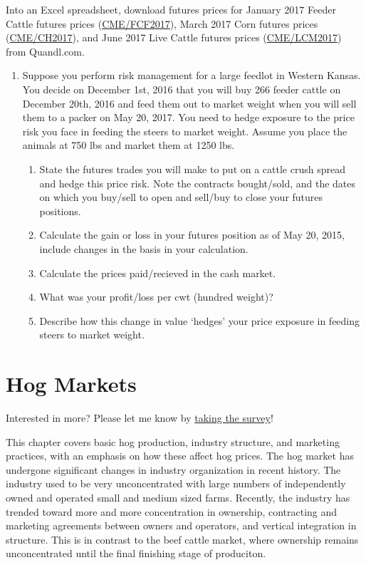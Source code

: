 \documentclass[
  letterpaper,
  DIV=11,
  numbers=noendperiod]{scrreprt}
\providecommand{\tightlist}{%
  \setlength{\itemsep}{0pt}\setlength{\parskip}{0pt}}\usepackage{longtable,booktabs,array}
\begin{document}
Into an Excel spreadsheet, download futures prices for January 2017
Feeder Cattle futures prices
(\href{https://www.quandl.com/data/CME/FCF2017}{CME/FCF2017}), March
2017 Corn futures prices
(\href{https://www.quandl.com/data/CME/CH2017}{CME/CH2017}), and June
2017 Live Cattle futures prices
(\href{https://www.quandl.com/data/CME/LCM2017}{CME/LCM2017}) from
Quandl.com.

\begin{enumerate}
\def\labelenumi{\arabic{enumi}.}
\item
  Suppose you perform risk management for a large feedlot in Western
  Kansas. You decide on December 1st, 2016 that you will buy 266 feeder
  cattle on December 20th, 2016 and feed them out to market weight when
  you will sell them to a packer on May 20, 2017. You need to hedge
  exposure to the price risk you face in feeding the steers to market
  weight. Assume you place the animals at 750 lbs and market them at
  1250 lbs.

  \begin{enumerate}
  \def\labelenumii{\alph{enumii}.}
  \tightlist
  \item
    State the futures trades you will make to put on a cattle crush
    spread and hedge this price risk. Note the contracts bought/sold,
    and the dates on which you buy/sell to open and sell/buy to close
    your futures positions.
  \item
    Calculate the gain or loss in your futures position as of May 20,
    2015, include changes in the basis in your calculation.
  \item
    Calculate the prices paid/recieved in the cash market.
  \item
    What was your profit/loss per cwt (hundred weight)?
  \item
    Describe how this change in value `hedges' your price exposure in
    feeding steers to market weight.
  \end{enumerate}
\end{enumerate}


\chapter{Hog Markets}\label{hog-markets}

{Interested in more? Please let me know by}
\href{https://forms.gle/Q3VByCQZHjfQSy9D7}{taking the survey}!

This chapter covers basic hog production, industry structure, and
marketing practices, with an emphasis on how these affect hog prices.
The hog market has undergone significant changes in industry
organization in recent history. The industry used to be very
unconcentrated with large numbers of independently owned and operated
small and medium sized farms. Recently, the industry has trended toward
more and more concentration in ownership, contracting and marketing
agreements between owners and operators, and vertical integration in
structure. This is in contrast to the beef cattle market, where
ownership remains unconcentrated until the final finishing stage of
produciton.
\end{document}
